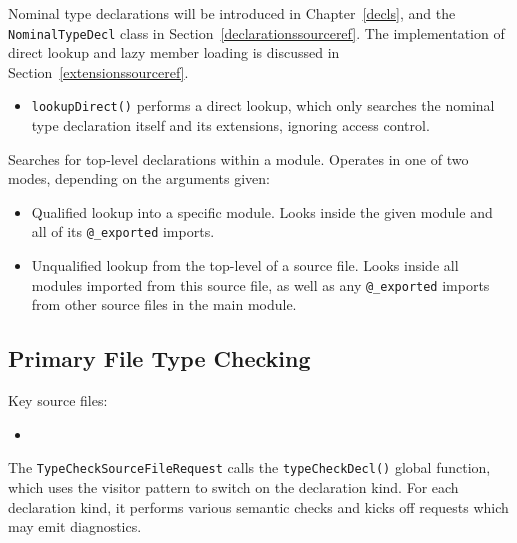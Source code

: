 \documentclass[../generics]{subfiles}
\begin{document}
Nominal type declarations will be introduced in Chapter~\ref{decls}, and the \texttt{NominalTypeDecl} class in Section~\ref{declarationssourceref}. The implementation of direct lookup and lazy member loading is discussed in Section~\ref{extensionssourceref}.
\begin{itemize}
\item \texttt{lookupDirect()} performs a direct lookup, which only searches the nominal type declaration itself and its extensions, ignoring access control.
\end{itemize}

Searches for top-level declarations within a module. Operates in one of two modes, depending on the arguments given:
\begin{itemize}
\item Qualified lookup into a specific module. Looks inside the given module and all of its \verb|@_exported| imports.
\item Unqualified lookup from the top-level of a source file. Looks inside all modules imported from this source file, as well as any \verb|@_exported| imports from other source files in the main module.
\end{itemize}

\subsection*{Primary File Type Checking}
Key source files:
\begin{itemize}
\item {}
\end{itemize}
The \texttt{TypeCheckSourceFileRequest} calls the \texttt{typeCheckDecl()} global function, which uses the visitor pattern to switch on the declaration kind. For each declaration kind, it performs various semantic checks and kicks off requests which may emit diagnostics.
\end{document}
